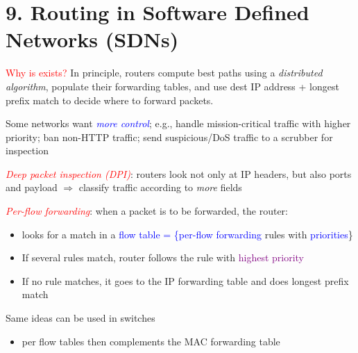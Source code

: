 \documentclass[11pt]{article}
\begin{document}
\section*{9. Routing in Software Defined Networks (SDNs)}

\textcolor{red}{Why is exists?} In principle, routers compute best paths using a \textit{distributed algorithm}, populate their forwarding tables, and use dest IP address + longest prefix match to decide where to forward packets. 

Some networks want \textcolor{blue}{\textit{more control}}; e.g., handle mission-critical traffic with higher priority; ban non-HTTP traffic; send suspicious/DoS traffic to a scrubber for inspection

\textcolor{red}{\textit{Deep packet inspection (DPI)}}: routers look not only at IP headers, but also ports and payload $\Rightarrow$ classify traffic according to  \textit{more} fields

\textcolor{red}{\textit{Per-flow forwarding}}: when a packet is to be forwarded, the router:
\begin{itemize}
	\item looks for a match in a \textcolor{blue}{flow table = \{per-flow forwarding} rules with \textcolor{blue}{priorities}\}
	\item If several rules match, router follows the rule with \textcolor{purple}{highest priority}
	\item If no rule matches, it goes to the IP forwarding table and does longest prefix match
\end{itemize}

Same ideas can be used in switches
\begin{itemize}
	\item per flow tables then complements the MAC forwarding table
\end{itemize}
\end{document}
